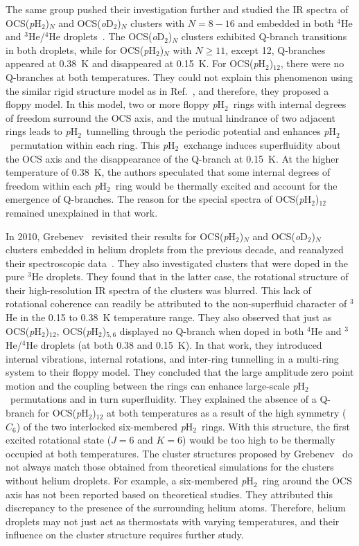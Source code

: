 \documentclass[12pt]{iopart}
\newcommand{\odtwo}{{\em o}D$_2$}
\newcommand{\phtwo}{{\em p}H$_2$}
\begin{document}
The same group pushed their investigation further and studied the IR spectra of OCS(\phtwo)$_N$ and OCS(\odtwo)$_N$ clusters with $N=8-16$ and embedded in both $^4$He and $^3$He/$^4$He droplets~\cite{grebenev_2008}. 
The OCS(\odtwo)$_N$ clusters exhibited Q-branch transitions in both droplets, while for OCS(\phtwo)$_N$ with $N \ge 11$, except 12, Q-branches appeared at 0.38~K and disappeared at 0.15~K. For OCS(\phtwo)$_{12}$, there were no Q-branches at both temperatures. 
They could not explain this phenomenon using the similar rigid structure model as in Ref.~\cite{grebenev_pH2_5ring}, and therefore, they proposed a floppy model. 
In this model, two or more floppy \phtwo~rings with internal degrees of freedom surround the OCS axis, and the mutual hindrance of two adjacent rings leads to \phtwo~tunnelling through the periodic potential and enhances \phtwo~permutation within each ring. 
This \phtwo~exchange induces superfluidity about the OCS axis and the disappearance of the Q-branch at 0.15~K. 
At the higher temperature of 0.38~K, the authors speculated that some internal degrees of freedom within each \phtwo~ring would be thermally excited and account for the emergence of Q-branches. 
The reason for the special spectra of OCS(\phtwo)$_{12}$ remained unexplained in that work.

In 2010, Grebenev \etal~revisited their results for OCS(\phtwo)$_N$ and OCS(\odtwo)$_N$ clusters embedded in helium droplets from the previous decade, and reanalyzed their spectroscopic data~\cite{grebenev_2010}. 
They also investigated  clusters that were doped in the pure $^3$He droplets. 
They found that in the latter case, the rotational structure of their high-resolution IR spectra of the clusters was blurred. 
This lack of rotational coherence can readily be attributed to the non-superfluid character of $^3$He in the 0.15 to 0.38~K temperature range.
They also observed that just as OCS(\phtwo)$_{12}$, OCS(\phtwo)$_{5,6}$ displayed no Q-branch when doped in both $^4$He and $^3$He/$^4$He droplets (at both 0.38 and 0.15~K). 
In that work, they introduced internal vibrations, internal rotations, and inter-ring tunnelling in a multi-ring system to their floppy model. 
They concluded that the large amplitude zero point motion and the coupling between the rings can enhance  large-scale \phtwo~permutations and in turn superfluidity. 
They explained the absence of a Q-branch for OCS(\phtwo)$_{12}$ at both temperatures as a result of the high symmetry ($C_6$) of the two interlocked six-membered \phtwo~rings. 
With this structure, the first excited rotational state ($J=6$ and $K=6$) would be too high to be thermally occupied at both temperatures. 
The cluster structures proposed by Grebenev \etal~do not always match those obtained from theoretical simulations for the clusters without helium droplets. For example, a six-membered \phtwo~ring around the OCS axis has not been reported based on theoretical studies. 
They attributed this discrepancy to the presence of the surrounding helium atoms. 
Therefore,  helium droplets may not just act as thermostats with varying temperatures, and their influence on the cluster structure requires further study.
\end{document}
